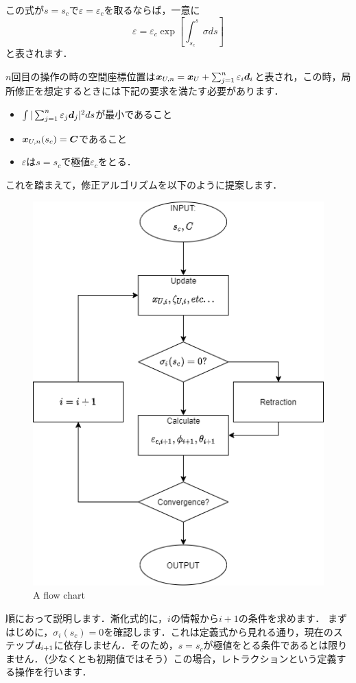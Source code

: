 \documentclass[16pt]{jsarticle}
\begin{document}
		この式が$ s = s_c $で$ \varepsilon=\varepsilon_c $を取るならば，一意に
		\begin{equation}\label{eq:vareq}
			\varepsilon = \varepsilon_c \exp \left[ \int_{s_c}^{s} \sigma ds \right]
		\end{equation}
		と表されます．
		
		$ n $回目の操作の時の空間座標位置は$ \boldsymbol{x}_{U,n} = \boldsymbol{x}_U + \sum_{j=1}^{n} \varepsilon_i \boldsymbol{d}_i$と表され，この時，局所修正を想定するときには下記の要求を満たす必要があります．
		\begin{itemize}
			\item $ \int |\sum_{j=1}^{n} \varepsilon_j \boldsymbol{d}_j|^2 ds  $が最小であること
			\item $ \boldsymbol{x}_{U,n}(s_c) = \boldsymbol{C} $であること
			\item $ \varepsilon $は$ s=s_c $で極値$ \varepsilon_c $をとる．
		\end{itemize}
		これを踏まえて，修正アルゴリズムを以下のように提案します．
		
		\begin{figure}[H]
			\centering
			\includegraphics[width = 0.6\columnwidth]{figure/AmendFlow.png}
			\caption{A flow chart}
		\end{figure}
		
		順におって説明します．漸化式的に，$i$の情報から$ i+1 $の条件を求めます．
		まずはじめに，$ \sigma_i(s_c)=0 $を確認します．これは定義式から見れる通り，現在のステップ$ \boldsymbol{d}_{i+1} $に依存しません．そのため，$ s=s_c $が極値をとる条件であるとは限りません．（少なくとも初期値ではそう）この場合，レトラクションという定義する操作を行います．
		
\end{document}
